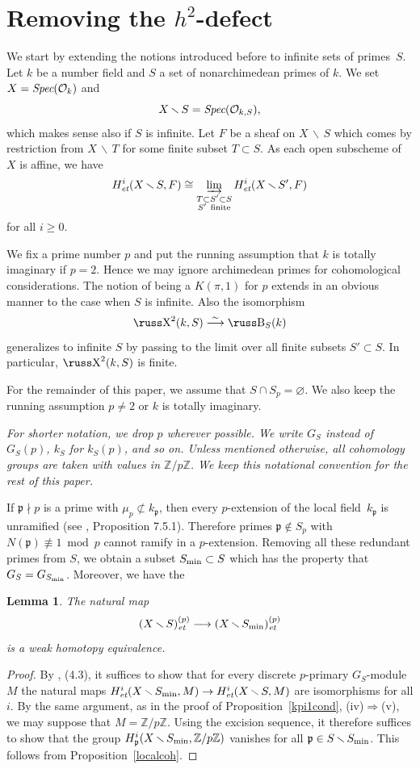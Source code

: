 \documentclass[10pt]{article}
\def\mapr#1{\stackrel{#1}{\longrightarrow}}
\newcommand{\Spec}{\text{\it Spec}}
\newcommand{\Z}{{\mathbb Z}}
\renewcommand{\O}{{\mathcal{O}}}
\newcommand{\p}{{\mathfrak p}}
\newcommand{\sm}{{\,\smallsetminus\,}}
\newcommand{\et}{\text{\it et}}
\renewcommand{\min}{\text{\rm min}}
\def\Sha{\hbox{\russ\char88}}
\def\Be{\hbox{\russ\char66}}
\theoremstyle{alex}
\newtheorem{lemma}[theorem]{Lemma}
\theoremstyle{alexdef}
\begin{document}
\section{\boldmath Removing the $h^2$-defect}\label{sect3}

We start by extending the notions introduced before to infinite sets of primes~$S$. Let $k$ be a number field and $S$ a set of nonarchimedean primes of $k$. We set $X=\Spec(\O_k)$ and
\[
X \sm S =\Spec(\O_{k,S}),
\]
which makes sense also if $S$ is infinite. Let $F$ be a sheaf on $X\sm S$ which comes by restriction from $X\sm T$ for some finite subset $T\subset S$. As each open subscheme of $X$ is affine, we have
\[
H^i_\et(X\sm S, F)  \cong \varinjlim_{\substack{T\subset S'\subset S\\ S'\ \mathrm{ finite}}} H^i_\et(X\sm S', F)
\]
for all $i\geq 0$.

\medskip
We fix a prime number $p$ and put the running assumption that $k$ is totally imaginary if $p=2$. Hence we may ignore archimedean primes for cohomological considerations. The notion of being a $K(\pi,1)$ for $p$ extends in an obvious manner to the case when $S$ is infinite.
Also the isomorphism
\[
\Sha^2(k,S) \mapr{\sim} \Be_S(k)
\]
generalizes to infinite $S$ by passing to the limit over all finite subsets $S'\subset S$.
In particular, $\Sha^2(k,S)$ is finite.


\bigskip
For the remainder of this paper, we assume that $S\cap S_p=\varnothing$. We also keep the running assumption $p\neq 2$ or $k$ is totally imaginary.
\bigskip

\begin{minipage}{11.5cm}
{\it  For shorter notation, we drop $p$ wherever possible. We write  $G_S$ instead of\/ $G_S(p)$,  $k_S$ for $k_S(p)$, and so on.  Unless mentioned otherwise, all cohomology groups are taken with values in $\Z/p\Z$. We keep this notational convention for the rest of this paper.
}
\end{minipage}


\bigskip\noindent
If $\p \nmid p$ is a prime with $\mu_p\not\subset k_\p$, then every $p$-extension of the local field~$k_\p$ is unra\-mi\-fied (see \cite{NSW}, Proposition 7.5.1).  Therefore primes $\p \notin  S_p$ with $N(\p) \not \equiv 1 \bmod p$  cannot ramify in a $p$-extension.
Removing all these redundant primes from $S$, we obtain a subset
$S_{\min} \subset S$ which has the property that $G_S=G_{S_{\min}}$. Moreover, we have the
\begin{lemma}\label{smin}
The natural map
$$
(X\sm S)_\et^{(p)} \longrightarrow (X\sm S_\min)_\et^{(p)}
$$
is a weak homotopy equivalence.
\end{lemma}
\begin{proof}
By \cite{AM}, (4.3), it suffices to show that for every discrete $p$-primary $G_S$-module $M$ the natural maps $H^i_\et(X\sm S_\min,M) \to H^i_\et(X\sm S,M)$ are isomorphisms for all $i$. By the same argument, as in the proof of Proposition~\ref{kpi1cond}, (iv)$\Rightarrow$(v), we may suppose that $M=\Z/p\Z$. Using the excision sequence, it therefore suffices to show that the group $H^i_\p(X\sm S_\min,\Z/p\Z)$ vanishes for all $\p\in S\sm S_\min$. This follows from Proposition~\ref{localcoh}.
\end{proof}
\end{document}
